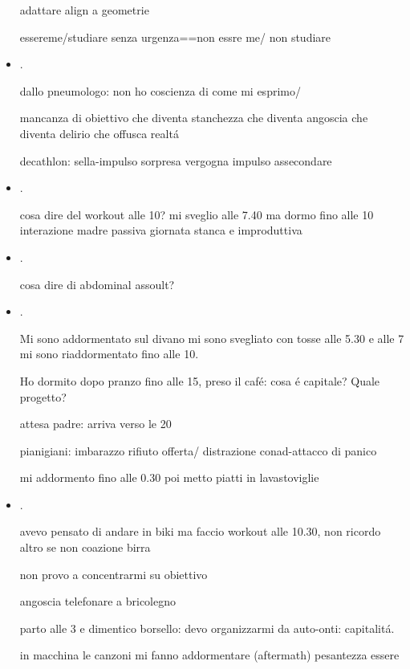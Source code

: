 \begin{itemize}
adattare align a geometrie

essereme/studiare senza urgenza==non essre me/ non studiare

\item {}.

dallo pneumologo: non ho coscienza di come mi esprimo/

mancanza di obiettivo che diventa stanchezza che diventa angoscia che diventa
delirio che offusca realt\'a

decathlon: sella-impulso sorpresa vergogna
impulso assecondare

\item {}.

cosa dire del workout alle 10?
mi sveglio alle 7.40 ma dormo fino alle 10
interazione madre passiva
giornata stanca e improduttiva

\item {}.

cosa dire di abdominal assoult?


\item {}.

Mi sono addormentato sul divano mi sono svegliato con tosse alle 5.30 e alle 7 mi sono riaddormentato fino alle 10.

Ho dormito dopo pranzo fino alle 15, preso il caf\'e: cosa \'e capitale? Quale progetto?


attesa padre: arriva verso le 20 

pianigiani: imbarazzo rifiuto offerta/ distrazione conad-attacco di panico

mi addormento fino alle 0.30 poi metto piatti in lavastoviglie

\item {}.

avevo pensato di andare in biki ma faccio workout alle 10.30, non ricordo altro se non coazione birra

non provo a concentrarmi su obiettivo

angoscia telefonare a bricolegno

parto alle 3 e dimentico borsello: devo organizzarmi da auto-onti: capitalit\'a.

in macchina le canzoni mi fanno addormentare (aftermath) pesantezza essere


\end{itemize}
